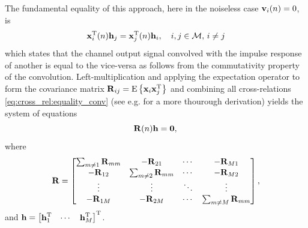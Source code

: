 \documentclass{article}
\newcommand{\h}{\mtxb{h}}
\newcommand{\x}{\mtxb{x}}
\newcommand{\R}{\mtxb{R}}
\newcommand{\Mset}{\mathcal{M}}
\begin{document}
The fundamental equality of this approach, here in the noiseless case \(\bm{\mathrm{v}}_i(n) = 0\), is 
\begin{equation}
    \x_i^{\T}(n) \h_j = \x_j^{\T}(n) \h_i,\quad i,j \in \Mset,\,i\neq j\label{eq:cross_rel:equality_conv}
\end{equation}
which states that the channel output signal convolved with the impulse response of another is equal to the vice-versa as follows from the commutativity property of the convolution.
Left-multiplication and applying the expectation operator to form the covariance matrix \(\R_{ij} = \ev{\x_i \x_j^\T}\) and combining all cross-relations \eqref{eq:cross_rel:equality_conv} (see e.g. \cite{huangAdaptiveMultichannelLeast2002} for a more thourough derivation) yields the system of equations  
\begin{equation}
    \R(n) \h = \bm{0}, \label{eq:cross_rel:null_space}\\
\end{equation}
where 
\begin{equation}
    \R = \begin{bmatrix}
        \sum_{m \neq 1} \R_{mm} & -\R_{21} & \cdots & -\R_{M1}\\
        -\R_{12} & \sum_{m \neq 2} \R_{mm} & \cdots & -\R_{M2}\\
        \vdots & \vdots & \ddots & \vdots\\
        -\R_{1M} & -\R_{2M} & \cdots & \sum_{m \neq M} \R_{mm}\\
    \end{bmatrix},\label{eq:cross_rel:data_matrix}
\end{equation}
and \(\h = \begin{bmatrix}
    \h_1^\T & \cdots & \h_M^\T
\end{bmatrix}^\T\).
\end{document}
